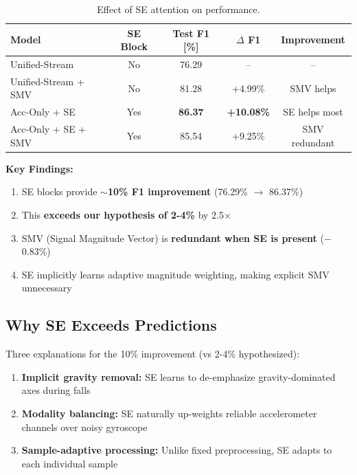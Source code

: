 \documentclass{article}
\begin{document}
\begin{table}[htbp]
    \centering
    \caption{Effect of SE attention on performance.}
    \label{tab:se_ablation}
    \begin{tabular}{lcccc}
        \toprule
        \textbf{Model} & \textbf{SE Block} & \textbf{Test F1 [\%]} & \textbf{$\Delta$ F1} & \textbf{Improvement} \\
        \midrule
        Unified-Stream & No & 76.29 & -- & -- \\
        Unified-Stream + SMV & No & 81.28 & +4.99\% & SMV helps \\
        Acc-Only + SE & Yes & \textbf{86.37} & \textbf{+10.08\%} & SE helps most \\
        Acc-Only + SE + SMV & Yes & 85.54 & +9.25\% & SMV redundant \\
        \bottomrule
    \end{tabular}
\end{table}

\textbf{Key Findings:}
\begin{enumerate}
    \item SE blocks provide \textbf{$\sim$10\% F1 improvement} (76.29\% $\rightarrow$ 86.37\%)
    \item This \textbf{exceeds our hypothesis of 2-4\%} by 2.5$\times$
    \item SMV (Signal Magnitude Vector) is \textbf{redundant when SE is present} ($-$0.83\%)
    \item SE implicitly learns adaptive magnitude weighting, making explicit SMV unnecessary
\end{enumerate}

\subsection{Why SE Exceeds Predictions}

Three explanations for the 10\% improvement (vs 2-4\% hypothesized):

\begin{enumerate}
    \item \textbf{Implicit gravity removal:} SE learns to de-emphasize gravity-dominated axes during falls
    \item \textbf{Modality balancing:} SE naturally up-weights reliable accelerometer channels over noisy gyroscope
    \item \textbf{Sample-adaptive processing:} Unlike fixed preprocessing, SE adapts to each individual sample
\end{enumerate}
\end{document}
